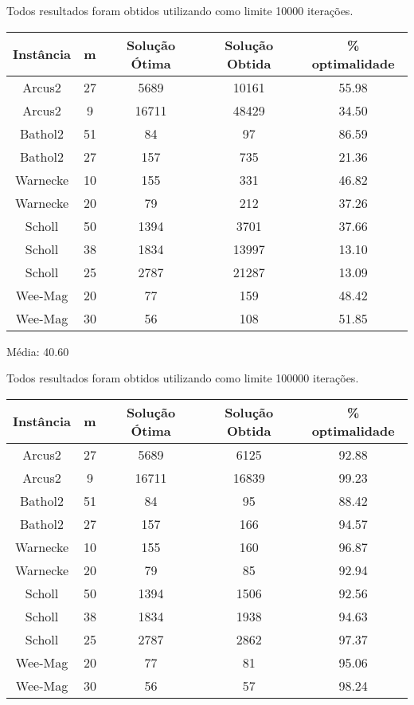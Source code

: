 \documentclass{report}
\begin{document}
Todos resultados foram obtidos utilizando como limite 10000 iterações.

\begin{table}[htbp]
 \begin{tabular}{|c|c|c|c|c|}
  \hline
  \textbf{Instância} & \textbf{m} & \textbf{Solução Ótima} & \textbf{Solução Obtida} & \% optimalidade \\
  \hline
  Arcus2 & 27 & 5689 & 10161 & 55.98 \\ %
  \hline
  Arcus2 & 9 & 16711 & 48429 & 34.50 \\ %
  \hline
  Bathol2 & 51 & 84 & 97 & 86.59 \\ %
  \hline
  Bathol2 & 27 & 157 & 735 & 21.36 \\ %
  \hline
  Warnecke & 10 & 155 & 331 & 46.82 \\ %
  \hline
  Warnecke & 20 & 79 & 212 & 37.26 \\ %
  \hline
  Scholl & 50 & 1394 & 3701 & 37.66 \\ %
  \hline
  Scholl & 38 & 1834 & 13997 & 13.10 \\ %
  \hline
  Scholl & 25 & 2787 & 21287 & 13.09 \\ %
  \hline
  Wee-Mag & 20 & 77 & 159 & 48.42 \\ %
  \hline
  Wee-Mag & 30 & 56 & 108 & 51.85 \\ %
  \hline
 \end{tabular}
\end{table}

Média: 40.60


Todos resultados foram obtidos utilizando como limite 100000 iterações.

\begin{table}[htbp]
 \begin{tabular}{|c|c|c|c|c|}
  \hline
  \textbf{Instância} & \textbf{m} & \textbf{Solução Ótima} & \textbf{Solução Obtida} & \% optimalidade \\
  \hline
  Arcus2 & 27 & 5689 & 6125 & 92.88 \\
  \hline
  Arcus2 & 9 & 16711 & 16839 & 99.23 \\
  \hline
  Bathol2 & 51 & 84 & 95 & 88.42 \\
  \hline
  Bathol2 & 27 & 157 & 166 & 94.57 \\
  \hline
  Warnecke & 10 & 155 & 160 & 96.87 \\
  \hline
  Warnecke & 20 & 79 & 85 & 92.94 \\
  \hline
  Scholl & 50 & 1394 & 1506 & 92.56 \\
  \hline
  Scholl & 38 & 1834 & 1938 & 94.63 \\
  \hline
  Scholl & 25 & 2787 & 2862 & 97.37 \\
  \hline
  Wee-Mag & 20 & 77 & 81 & 95.06 \\
  \hline
  Wee-Mag & 30 & 56 & 57 & 98.24 \\
  \hline
 \end{tabular}
\end{table}
\end{document}
